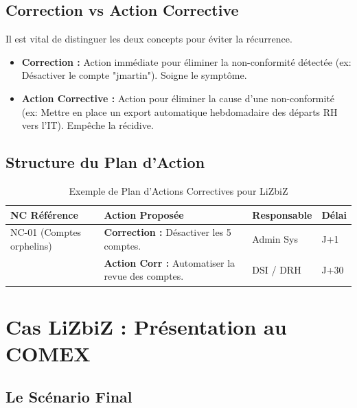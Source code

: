 \subsection{Correction vs Action Corrective}

Il est vital de distinguer les deux concepts pour éviter la récurrence.

\begin{boxdef}
\begin{itemize}
    \item \textbf{Correction :} Action immédiate pour éliminer la non-conformité détectée (ex: Désactiver le compte "jmartin"). Soigne le symptôme.
    \item \textbf{Action Corrective :} Action pour éliminer la cause d'une non-conformité (ex: Mettre en place un export automatique hebdomadaire des départs RH vers l'IT). Empêche la récidive.
\end{itemize}
\end{boxdef}

\subsection{Structure du Plan d'Action}

\begin{table}[htbp]
\centering
\small
\begin{tabular}{p{3cm}p{4cm}p{2cm}p{2cm}}
    \toprule
    \textbf{NC Référence} & \textbf{Action Proposée} & \textbf{Responsable} & \textbf{Délai} \\
    \midrule
    NC-01 (Comptes orphelins) & \textbf{Correction :} Désactiver les 5 comptes. & Admin Sys & J+1 \\
    & \textbf{Action Corr :} Automatiser la revue des comptes. & DSI / DRH & J+30 \\
    \bottomrule
\end{tabular}
\caption{Exemple de Plan d'Actions Correctives pour LiZbiZ}
\end{table}

\section{Cas LiZbiZ : Présentation au COMEX}

\subsection{Le Scénario Final}

